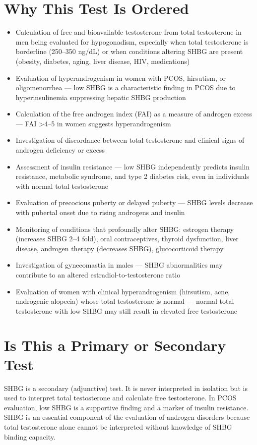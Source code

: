 \section*{Why This Test Is Ordered}
\begin{itemize}
  \item Calculation of free and bioavailable testosterone from total testosterone in men being evaluated for hypogonadism, especially when total testosterone is borderline (250--350 ng/dL) or when conditions altering SHBG are present (obesity, diabetes, aging, liver disease, HIV, medications)
  \item Evaluation of hyperandrogenism in women with PCOS, hirsutism, or oligomenorrhea --- low SHBG is a characteristic finding in PCOS due to hyperinsulinemia suppressing hepatic SHBG production
  \item Calculation of the free androgen index (FAI) as a measure of androgen excess --- FAI >4--5 in women suggests hyperandrogenism
  \item Investigation of discordance between total testosterone and clinical signs of androgen deficiency or excess
  \item Assessment of insulin resistance --- low SHBG independently predicts insulin resistance, metabolic syndrome, and type 2 diabetes risk, even in individuals with normal total testosterone
  \item Evaluation of precocious puberty or delayed puberty --- SHBG levels decrease with pubertal onset due to rising androgens and insulin
  \item Monitoring of conditions that profoundly alter SHBG: estrogen therapy (increases SHBG 2--4 fold), oral contraceptives, thyroid dysfunction, liver disease, androgen therapy (decreases SHBG), glucocorticoid therapy
  \item Investigation of gynecomastia in males --- SHBG abnormalities may contribute to an altered estradiol-to-testosterone ratio
  \item Evaluation of women with clinical hyperandrogenism (hirsutism, acne, androgenic alopecia) whose total testosterone is normal --- normal total testosterone with low SHBG may still result in elevated free testosterone
\end{itemize}

\section*{Is This a Primary or Secondary Test}
SHBG is a secondary (adjunctive) test. It is never interpreted in isolation but is used to interpret total testosterone and calculate free testosterone. In PCOS evaluation, low SHBG is a supportive finding and a marker of insulin resistance. SHBG is an essential component of the evaluation of androgen disorders because total testosterone alone cannot be interpreted without knowledge of SHBG binding capacity.

